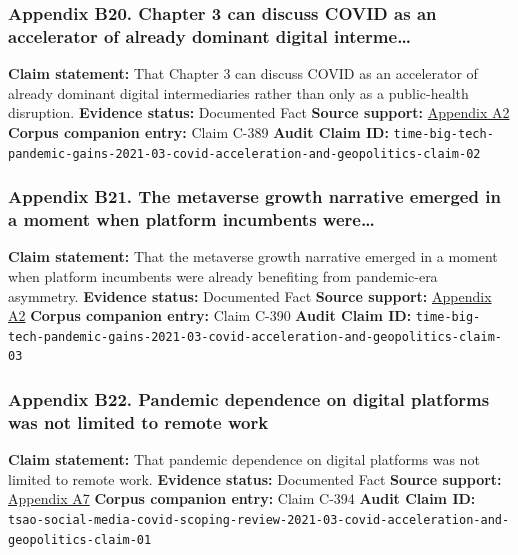 \documentclass[
  american,
  11pt,
  letterpaper,
]{article}
\begin{document}
\subsubsection{Appendix B20. Chapter 3 can discuss COVID as an
accelerator of already dominant digital
interme\ldots{}}\label{ch-03-appendix-b20-chapter-3-can-discuss-covid-as-an-accelerator-of-already-dominant-digital-interme}

\textbf{Claim statement:} That Chapter 3 can discuss COVID as an
accelerator of already dominant digital intermediaries rather than only
as a public-health disruption. \textbf{Evidence status:} Documented Fact
\textbf{Source support:}
\hyperref[ch-03-appendix-a2-big-tech-announces-striking-pandemic-gains-as-small-businesses-strain-to-find-their-footing]{Appendix
A2} \textbf{Corpus companion entry:} Claim C-389 \textbf{Audit Claim
ID:}
\texttt{time-big-tech-pandemic-gains-2021-03-covid-acceleration-and-geopolitics-claim-02}

\subsubsection{Appendix B21. The metaverse growth narrative emerged in a
moment when platform incumbents
were\ldots{}}\label{ch-03-appendix-b21-the-metaverse-growth-narrative-emerged-in-a-moment-when-platform-incumbents-were}

\textbf{Claim statement:} That the metaverse growth narrative emerged in
a moment when platform incumbents were already benefiting from
pandemic-era asymmetry. \textbf{Evidence status:} Documented Fact
\textbf{Source support:}
\hyperref[ch-03-appendix-a2-big-tech-announces-striking-pandemic-gains-as-small-businesses-strain-to-find-their-footing]{Appendix
A2} \textbf{Corpus companion entry:} Claim C-390 \textbf{Audit Claim
ID:}
\texttt{time-big-tech-pandemic-gains-2021-03-covid-acceleration-and-geopolitics-claim-03}

\subsubsection{Appendix B22. Pandemic dependence on digital platforms
was not limited to remote
work}\label{ch-03-appendix-b22-pandemic-dependence-on-digital-platforms-was-not-limited-to-remote-work}

\textbf{Claim statement:} That pandemic dependence on digital platforms
was not limited to remote work. \textbf{Evidence status:} Documented
Fact \textbf{Source support:}
\hyperref[ch-03-appendix-a7-what-social-media-told-about-us-in-the-time-of-covid-19-a-scoping-review]{Appendix
A7} \textbf{Corpus companion entry:} Claim C-394 \textbf{Audit Claim
ID:}
\texttt{tsao-social-media-covid-scoping-review-2021-03-covid-acceleration-and-geopolitics-claim-01}
\end{document}
